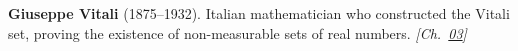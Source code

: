 \textbf{Giuseppe Vitali} (1875–1932). Italian mathematician who constructed the Vitali set, proving the existence of non-measurable sets of real numbers. \emph{[Ch.~\hyperref[ch:banach]{03}]}

